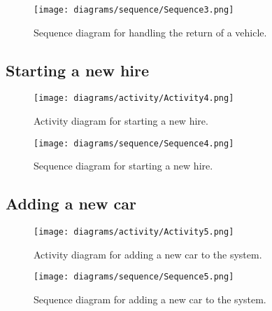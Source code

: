     \begin{figure}[H]
      \centering
      \texttt{[image: diagrams/sequence/Sequence3.png]}
      \caption{Sequence diagram for handling the return of a vehicle.}
      \label{fig:vehicleReturnSequence}
    \end{figure}
  \newpage

  \subsection{Starting a new hire}
    \begin{figure}[H]
      \centering
      \texttt{[image: diagrams/activity/Activity4.png]}
      \caption{Activity diagram for starting a new hire.}
      \label{fig:hireStartActivity}
    \end{figure}

    \begin{figure}[H]
      \centering
      \texttt{[image: diagrams/sequence/Sequence4.png]}
      \caption{Sequence diagram for starting a new hire.}
      \label{fig:startHireSequence}
    \end{figure}
  \newpage

  \subsection{Adding a new car}

    \begin{figure}[H]
      \centering
      \texttt{[image: diagrams/activity/Activity5.png]}
      \caption{Activity diagram for adding a new car to the system.}
      \label{fig:newCarActivity}
    \end{figure}

    \begin{figure}[H]
      \centering
      \texttt{[image: diagrams/sequence/Sequence5.png]}
      \caption{Sequence diagram for adding a new car to the system.}
      \label{fig:newCarSequence}
    \end{figure}

\newpage
